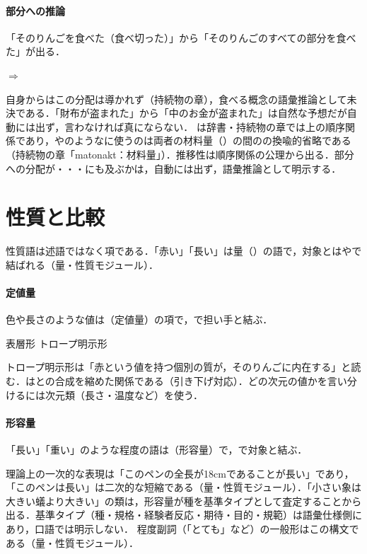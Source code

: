 \documentclass[../../main-detail.tex]{subfiles}
\begin{document}
\paragraph{部分への推論}
「そのりんごを食べた（食べ切った）」から「そのりんごのすべての部分を食べた」が出る．
\begin{exe}
    \ex {}$\Longrightarrow$
\end{exe}
自身からはこの分配は導かれず（持続物の章），食べる概念の語彙推論として未決である．「財布が盗まれた」から「中のお金が盗まれた」は自然な予想だが自動には出ず，言わなければ真にならない．
は辞書・持続物の章では上の順序関係であり，やのようなに使うのは両者の材料量（）の間のの換喩的省略である（持続物の章「matonakt：材料量」）．推移性は順序関係の公理から出る．部分への分配が・・・にも及ぶかは，自動には出ず，語彙推論として明示する．

\section{性質と比較}
性質語は述語ではなく項である．「赤い」「長い」は量（）の語で，対象とはやで結ばれる（量・性質モジュール）．

\paragraph{定値量}
色や長さのような値は（定値量）の項で，で担い手と結ぶ．
\begin{exe}
    \ex\begin{xlist}
        \ex {}\hfill 表層形
        \ex {}\hfill トロープ明示形
    \end{xlist}
    \glt {}
\end{exe}
トロープ明示形は「赤という値を持つ個別の質が，そのりんごに内在する」と読む．はとの合成を縮めた関係である（引き下げ対応）．どの次元の値かを言い分けるには次元類（長さ・温度など）を使う．

\paragraph{形容量}
「長い」「重い」のような程度の語は（形容量）で，で対象と結ぶ．
\begin{exe}
    \ex {}\hfill {}
    \ex {}\hfill {}
    \ex {}\hfill {}
\end{exe}
理論上の一次的な表現は「このペンの全長が18cmであることが長い」であり，「このペンは長い」は二次的な短縮である（量・性質モジュール）．「小さい象は大きい蟻より大きい」の類は，形容量が種を基準タイプとして査定することから出る．基準タイプ（種・規格・経験者反応・期待・目的・規範）は語彙仕様側にあり，口語では明示しない．
程度副詞（「とても」など）の一般形はこの構文である（量・性質モジュール）．
\end{document}
